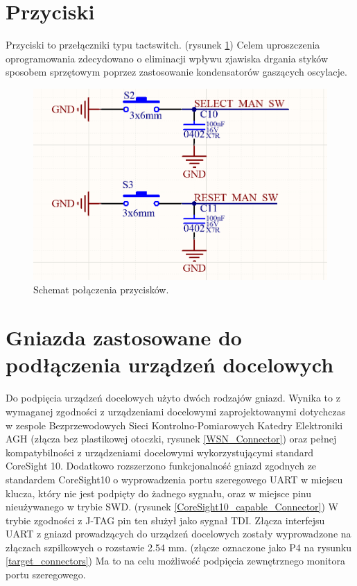 \section {Przyciski}
Przyciski to przełączniki typu tactswitch. (rysunek \ref{tactswitches}) Celem uproszczenia oprogramowania zdecydowano o eliminacji wpływu zjawiska drgania styków sposobem sprzętowym poprzez zastosowanie kondensatorów gaszących oscylacje.

\begin{figure}[H]
    \centering
    \includegraphics[width=0.7\paperwidth]{images/MCU_switches_debouncing.png}
    \caption{Schemat połączenia przycisków.}
    \label{tactswitches}
\end{figure}


\section{Gniazda zastosowane do podłączenia urządzeń docelowych}

Do podpięcia urządzeń docelowych użyto dwóch rodzajów gniazd. Wynika to z wymaganej zgodności z urządzeniami docelowymi zaprojektowanymi dotychczas w zespole Bezprzewodowych Sieci Kontrolno-Pomiarowych Katedry Elektroniki AGH (złącza bez plastikowej otoczki, rysunek \ref{WSN_Connector}) oraz pełnej kompatybilności z urządzeniami docelowymi wykorzystującymi standard CoreSight 10. Dodatkowo rozszerzono funkcjonalność gniazd zgodnych ze standardem CoreSight10 o wyprowadzenia portu szeregowego UART w miejscu klucza, który nie jest podpięty do żadnego sygnału, oraz w miejsce pinu nieużywanego w trybie SWD. (rysunek \ref{CoreSight10_capable_Connector}) W trybie zgodności z J-TAG pin ten służył jako sygnał TDI. 
Złącza interfejsu UART z gniazd prowadzących do urządzeń docelowych zostały wyprowadzone na złączach szpilkowych o rozstawie 2.54 mm. (złącze oznaczone jako P4 na rysunku \ref{target_connectors}) Ma to na celu możliwość podpięcia zewnętrznego monitora portu szeregowego.


